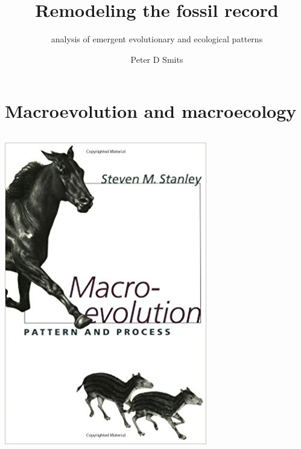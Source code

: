 \documentclass{beamer}
\title{Remodeling the fossil record}
\subtitle{analysis of emergent evolutionary and ecological patterns}
\author{Peter D Smits}
\institute{Committee on Evolutionary Biology, University of Chicago}
\date{}
\begin{document}
\begin{frame}
  \maketitle
\end{frame}

\begin{frame}
  \tableofcontents
\end{frame}

\section{Macroevolution and macroecology}

\begin{frame}
  \begin{columns}
    \begin{column}{0.5\textwidth}
      \begin{center}
        \includegraphics[height=0.8\textheight,width=\textwidth,keepaspectratio=true]{figure/stanley_macro}

\end{center}
\end{column}
\end{columns}
\end{frame}
\end{document}

